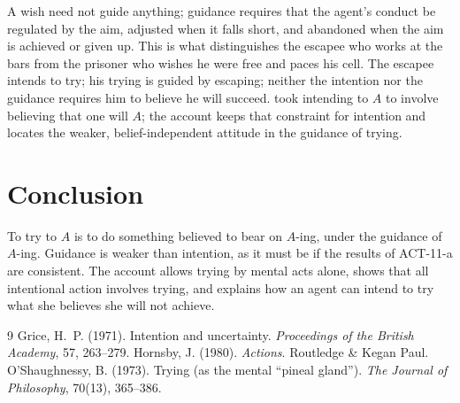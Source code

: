 \documentclass{situationist-preprint}
\begin{document}
\begin{reply}
A wish need not guide anything; guidance requires that the agent's conduct be regulated by the aim, adjusted when it falls short, and abandoned when the aim is achieved or given up. This is what distinguishes the escapee who works at the bars from the prisoner who wishes he were free and paces his cell. The escapee intends to try; his trying is guided by escaping; neither the intention nor the guidance requires him to believe he will succeed. \citet{Grice1971} took intending to $A$ to involve believing that one will $A$; the account keeps that constraint for intention and locates the weaker, belief-independent attitude in the guidance of trying.
\end{reply}

\section{Conclusion}

To try to $A$ is to do something believed to bear on $A$-ing, under the guidance of $A$-ing. Guidance is weaker than intention, as it must be if the results of ACT-11-a are consistent. The account allows trying by mental acts alone, shows that all intentional action involves trying, and explains how an agent can intend to try what she believes she will not achieve.

\begin{thebibliography}{9}\small
{} Grice, H.~P. (1971). Intention and uncertainty. \emph{Proceedings of the British Academy}, 57, 263--279.
 Hornsby, J. (1980). \emph{Actions}. Routledge \& Kegan Paul.
 O'Shaughnessy, B. (1973). Trying (as the mental \enquote{pineal gland}). \emph{The Journal of Philosophy}, 70(13), 365--386.
\end{thebibliography}
\end{document}
